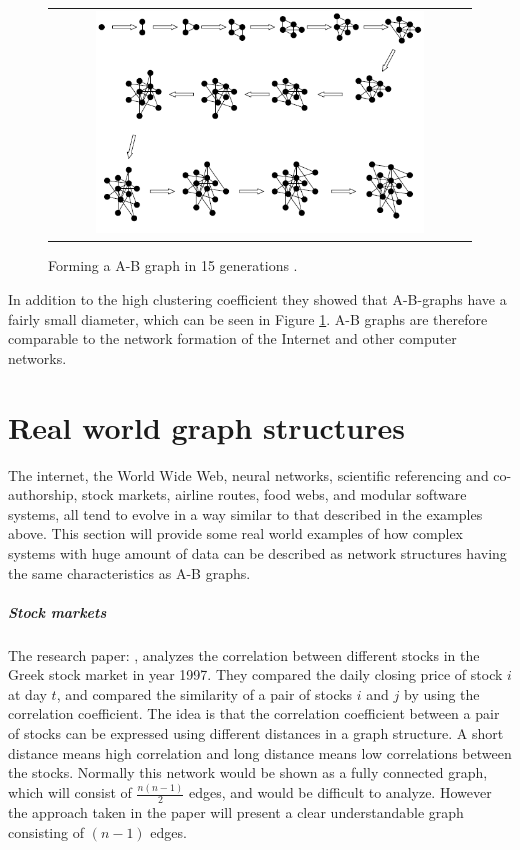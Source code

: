 \begin{figure}[h]
\centering
\begin{tabular}{@{}c@{}}
\includegraphics[width=0.8\textwidth]{../Figures/ABgraphcreation.png}
\end{tabular}
\caption{\label{fig:ABgraphcreation} Forming a A-B graph in 15 generations \cite{audestad}.}
\end{figure}

In addition to the high clustering coefficient they showed that A-B-graphs have a fairly small diameter,
 which can be seen in Figure \ref{fig:ABgraphcreation}. 
 A-B graphs are therefore comparable to the network formation of the Internet and other computer networks. 
 
\section{Real world graph structures}

The internet, the World Wide Web, neural networks, scientific referencing and co-authorship, stock markets, airline routes, food 
webs, and modular software systems, all tend to evolve in a way similar to that described in the examples 
above. This section will provide some real world examples of how complex systems with huge amount of data can be described as network structures having the same characteristics as A-B graphs.
\subparagraph{Stock markets} The research paper: \cite{greekStockMarket}, analyzes the correlation between different stocks in the Greek stock market in year 1997. They compared the daily closing price of stock $i$ at day $t$, and compared the similarity of a pair of stocks $i$ and $j$ by using the correlation coefficient. The idea is that the correlation coefficient between a pair of stocks can be expressed using different distances in a graph structure. A short distance means high correlation and long distance means low correlations between the stocks. Normally this network would be shown as a fully connected graph, which will consist of $\frac{n(n-1)}{2}$ edges, and would be difficult to analyze. However the approach taken in the paper will present a clear understandable graph consisting of $(n-1)$ edges.


